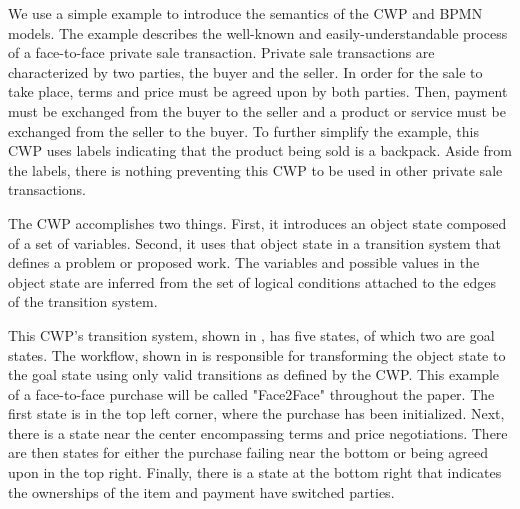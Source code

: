 We use a simple example to introduce the semantics of the CWP and BPMN models. The example describes the well-known and easily-understandable process of a face-to-face private sale transaction. Private sale transactions are characterized by two parties, the buyer and the seller. In order for the sale to take place, terms and price must be agreed upon by both parties. Then, payment must be exchanged from the buyer to the seller and a product or service must be exchanged from the seller to the buyer. To further simplify the example, this CWP uses labels indicating that the product being sold is a backpack. Aside from the labels, there is nothing preventing this CWP to be used in other private sale transactions.

The CWP accomplishes two things. First, it introduces an object state composed of a set of variables. Second, it uses that object state in a transition system that defines a problem or proposed work. The variables and possible values in the object state are inferred from the set of logical conditions attached to the edges of the transition system.

This CWP's transition system, shown in , has five states, of which two are goal states. The workflow, shown in  is responsible for transforming the object state to the goal state using only valid transitions as defined by the CWP. This example of a face-to-face purchase will be called "Face2Face" throughout the paper. The first state is in the top left corner, where the purchase has been initialized. Next, there is a state near the center encompassing terms and price negotiations. There are then states for either the purchase failing near the bottom or being agreed upon in the top right. Finally, there is a state at the bottom right that indicates the ownerships of the item and payment have switched parties.

